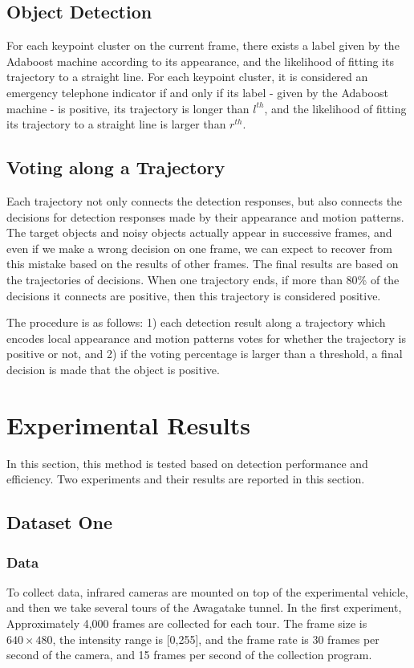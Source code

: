 \subsection{Object Detection}

For each keypoint cluster on the current frame, there exists a label given by the Adaboost machine according to its appearance, and the likelihood of fitting its trajectory to a straight line.  For each keypoint cluster, it is considered an emergency telephone indicator if and only if its label - given by the Adaboost machine - is positive, its trajectory is longer than $l^{th}$, and the likelihood of fitting its trajectory to a straight line is larger than $r^{th}$.


\subsection{Voting along a Trajectory}

Each trajectory not only connects the detection responses, but also connects the decisions for detection responses made by their appearance and motion patterns. The target objects and noisy objects actually appear in successive frames, and even if we make a wrong decision on one frame, we can expect to recover from this mistake based on the results of other frames. The final results are based on the trajectories of decisions. When one trajectory ends, if more than 80\% of the decisions it connects are positive, then this trajectory is considered positive.


The procedure is as follows: 1) each detection result along a trajectory which encodes local appearance and motion patterns votes for whether the trajectory is positive or not, and 2) if the voting percentage is larger than a threshold, a final decision is made that the object is positive.



\section{Experimental Results}
\label{exp}
In this section, this method is tested based on detection performance and efficiency. Two experiments  and their results are reported in this section.

\subsection{Dataset One}

\subsubsection{Data} To collect data, infrared cameras are mounted on top of the experimental vehicle, and then we take several tours of the Awagatake tunnel. In the first experiment,  Approximately 4,000 frames are collected for each tour. The frame size is $640\times 480$, the intensity range is [0,255], and the frame rate is 30 frames per second of the camera, and 15 frames per second of the collection program.

